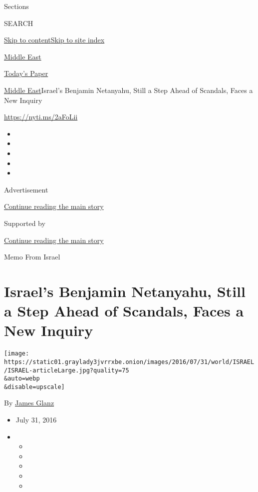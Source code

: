 Sections

SEARCH

\protect\hyperlink{site-content}{Skip to
content}\protect\hyperlink{site-index}{Skip to site index}

\href{https://www.nytimes3xbfgragh.onion/section/world/middleeast}{Middle
East}

\href{https://myaccount.nytimes3xbfgragh.onion/auth/login?response_type=cookie\&client_id=vi}{}

\href{https://www.nytimes3xbfgragh.onion/section/todayspaper}{Today's
Paper}

\href{/section/world/middleeast}{Middle East}\textbar{}Israel's Benjamin
Netanyahu, Still a Step Ahead of Scandals, Faces a New Inquiry

\url{https://nyti.ms/2aFoLii}

\begin{itemize}
\item
\item
\item
\item
\item
\end{itemize}

Advertisement

\protect\hyperlink{after-top}{Continue reading the main story}

Supported by

\protect\hyperlink{after-sponsor}{Continue reading the main story}

Memo From Israel

\hypertarget{israels-benjamin-netanyahu-still-a-step-ahead-of-scandals-faces-a-new-inquiry}{%
\section{Israel's Benjamin Netanyahu, Still a Step Ahead of Scandals,
Faces a New
Inquiry}\label{israels-benjamin-netanyahu-still-a-step-ahead-of-scandals-faces-a-new-inquiry}}

\texttt{[image: https://static01.graylady3jvrrxbe.onion/images/2016/07/31/world/ISRAEL/ISRAEL-articleLarge.jpg?quality=75\\\&auto=webp\\\&disable=upscale]}

By \href{http://www.nytimes3xbfgragh.onion/by/james-glanz}{James Glanz}

\begin{itemize}
\item
  July 31, 2016
\item
  \begin{itemize}
  \item
  \item
  \item
  \item
  \item
  \end{itemize}
\end{itemize}

